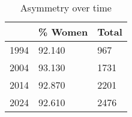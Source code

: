 \begin{table}
	\caption[tab:diachronic-asymmetry]{Asymmetry over time}
	\begin{center}
		\begin{tabular}{lll}
			\toprule
			 & \% Women & Total \\
			\midrule
			1994 & 92.140 & 967 \\
			2004 & 93.130 & 1731 \\
			2014 & 92.870 & 2201 \\
			2024 & 92.610 & 2476 \\
			\bottomrule
		\end{tabular}
	\end{center}
\end{table}